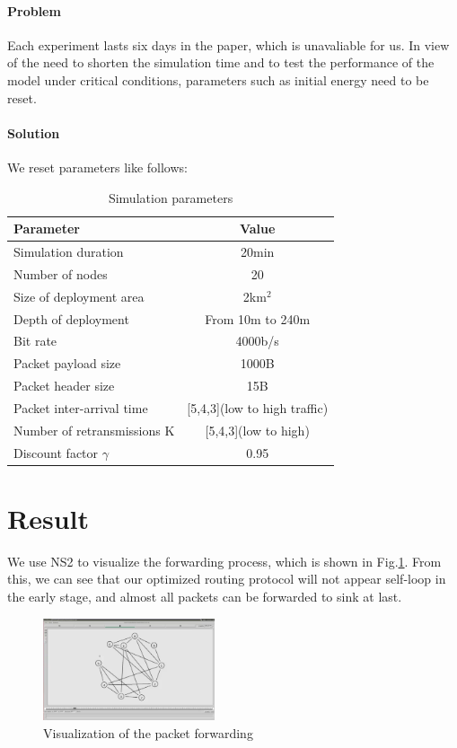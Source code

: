 \documentclass[10pt,twocolumn,letterpaper]{article}
\begin{document}
\paragraph{Problem}
Each experiment lasts six days in the paper, which is unavaliable for us. In view of the need to shorten the simulation time and to test the performance of the model under critical conditions, parameters such as initial energy need to be reset.
\paragraph{Solution}
We reset parameters like follows:
\begin{table}[hbtp]
	\centering
	\caption{Simulation parameters}
	\begin{tabular}{|l|c|}
		\hline
		\textbf{Parameter}&\textbf{Value}\\
		\hline
		Simulation duration&20min\\
		\hline
		Number of nodes&20\\
		\hline
		Size of deployment area&2km$^2$\\
		\hline
		Depth of deployment&From 10m to 240m\\
		\hline
		Bit rate&4000b/s\\
		\hline
		Packet payload size&1000B\\
		\hline
		Packet header size&15B\\
		\hline
		Packet inter-arrival time&[5,4,3](low to high traffic)\\
		\hline
		Number of retransmissions K&[5,4,3](low to high)\\
		\hline
		Discount factor $\gamma$&0.95\\
		\hline
	\end{tabular}
\end{table}
\section{Result}
We use NS2 to visualize the forwarding process, which is shown in Fig.\ref{ref:vis}. From this, we can see that our optimized routing protocol will not appear self-loop in the early stage, and almost all packets can be forwarded to sink at last.
\begin{figure}[htbp]
	\centering
	\includegraphics[width=0.45\textwidth]{figure/visual.png}
	\caption{Visualization of the packet forwarding}
	\label{ref:vis}
\end{figure}
\end{document}
